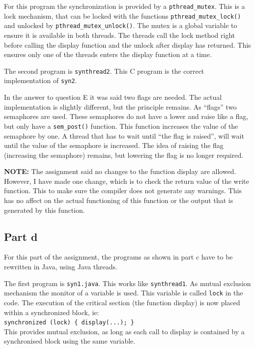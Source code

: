 \documentclass[a4paper]{article}
\begin{document}
For this program the synchronization is provided by a \texttt{pthread\_mutex}. This is a 
lock mechanism, that can be locked with the functions \texttt{pthread\_mutex\_lock()} and
unlocked by \texttt{pthread\_mutex\_unlock()}. The mutex is a global variable to ensure it 
is available in both threads. The threads call the lock method right before calling the
display function and the unlock after display has returned. This ensures only one of the
threads enters the display function at a time.

The second program is \texttt{synthread2}. This C program is the correct implementation of
\texttt{syn2}.

In the answer to question E it was said two flags are needed. The actual implementation is
slightly different, but the principle remains. As ``flags'' two semaphores are used. These
semaphores do not have a lower and raise like a flag, but only have a \texttt{sem\_post()}
function. This function increases the value of the semaphore by one. A thread that has to
wait until ``the flag is raised'', will wait until the value of the semaphore is 
increased. The idea of raising the flag (increasing the semaphore) remains, but lowering 
the flag is no longer required.

\textbf{NOTE:} The assignment said no changes to the function display are allowed. 
However, I have made one change, which is to check the return value of the write function.
This to make sure the compiler does not generate any warnings. This has no affect on the
actual functioning of this function or the output that is generated by this function.

\subsection{Part d}

For this part of the assignment, the programs as shown in part c have to be rewritten in
Java, using Java threads.

The first program is \texttt{syn1.java}. This works like \texttt{synthread1}. As mutual
exclusion mechanism the monitor of a variable is used. This variable is called 
\texttt{lock} in the code. The execution of the critical section (the function display)
is now placed within a synchronized block, ie: \\\texttt{synchronized (lock) \{ 
display(...); \} }\\
This provides mutual exclusion, as long as each call to display is contained by a 
synchronised block using the same variable.
\end{document}
